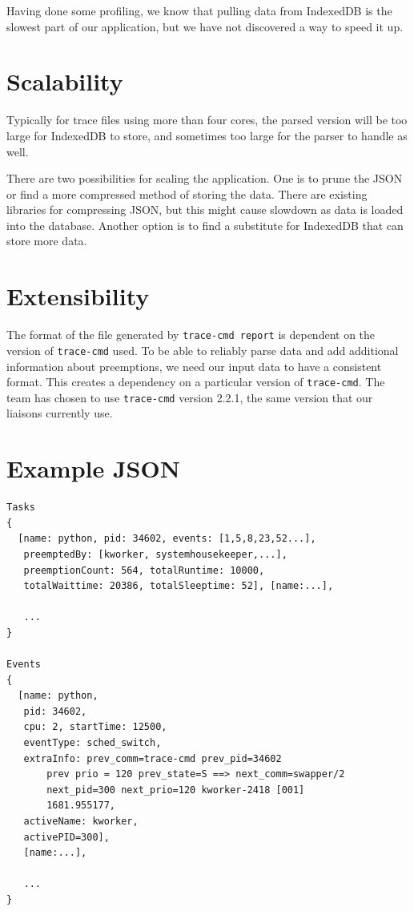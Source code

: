 \documentclass{hmcclinic}
\begin{document}
Having done some profiling, we know that pulling data from IndexedDB is the
slowest part of our application, but we have not discovered a way to speed it up.

\section{Scalability}
Typically for trace files using more than four
cores, the parsed version will be too large for IndexedDB to store, and
sometimes too large for the parser to handle as well.

There are two possibilities for scaling the application. One is to prune the JSON or
find a more compressed method of storing the data. There are existing libraries
for compressing JSON, but this might cause slowdown as data is
 loaded into the database.
Another option is to find a substitute for IndexedDB that can store more data.

\section{Extensibility}
  The format of the file generated by \texttt{trace-cmd
  report} is dependent on the version of \texttt{trace-cmd} used. To be able to reliably
  parse data and add additional information about preemptions, we need our input
  data to have a consistent format. This creates a dependency on a particular
  version of \texttt{trace-cmd}. The team has chosen to use \texttt{trace-cmd} version 2.2.1, 
  the same version that our liaisons currently use.

\newpage
\appendix
\renewcommand{\thesection}{Appendix \Alph{section}}
\section{Example JSON} \label{App:AppendixA}

\begin{verbatim}
Tasks
{
  [name: python, pid: 34602, events: [1,5,8,23,52...], 
   preemptedBy: [kworker, systemhousekeeper,...], 
   preemptionCount: 564, totalRuntime: 10000,
   totalWaittime: 20386, totalSleeptime: 52], [name:...],

   ...   
}

Events
{
  [name: python, 
   pid: 34602, 
   cpu: 2, startTime: 12500, 
   eventType: sched_switch,
   extraInfo: prev_comm=trace-cmd prev_pid=34602 
       prev prio = 120 prev_state=S ==> next_comm=swapper/2 
       next_pid=300 next_prio=120 kworker-2418 [001]
       1681.955177, 
   activeName: kworker, 
   activePID=300], 
   [name:...], 

   ...
}
\end{verbatim}
\newpage
\end{document}
